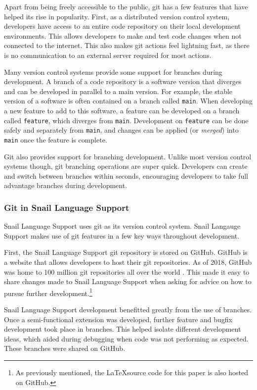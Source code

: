 \documentclass{article}
\begin{document}
Apart from being freely accessible to the public, git has a few features that have helped its rise in popularity. First, as a distributed version control system, developers have access to an entire code repository on their local development environments. This allows developers to make and test code changes when not connected to the internet. This also makes git actions feel lightning fast, as there is no communication to an external server required for most actions. 

Many version control systems provide some support for branches during development. A branch of a code repository is a software version that diverges and can be developed in parallel to a main version. For example, the stable version of a software is often contained on a branch called \lstinline{main}. When developing a new feature to add to this software, a feature can be developed on a branch called \lstinline{feature}, which diverges from \lstinline{main}. Development on \lstinline{feature} can be done safely and separately from \lstinline{main}, and changes can be applied (or \emph{merged}) into \lstinline{main} once the feature is complete.

Git also provides support for branching development. Unlike most version control systems though, git branching operations are super quick. Developers can create and switch between branches within seconds, encouraging developers to take full advantage branches during development. 

\subsubsection{Git in Snail Language Support}

Snail Language Support uses git as its version control system. Snail Langauge Support makes use of git features in a few key ways throughout development.

First, the Snail Language Support git repository is stored on GitHub. GitHub is a website that allows developers to host their git repositories. As of 2018, GitHub was home to 100 million git repositories all over the world \cite{Warner_2018}. This made it easy to share changes made to Snail Language Support when asking for advice on how to pursue further development.\footnote{As previously mentioned, the \LaTeX source code for this paper is also hosted on GitHub.}

Snail Language Support development benefitted greatly from the use of branches. Once a semi-functional extension was developed, further feature and bugfix development took place in branches. This helped isolate different development ideas, which aided during debugging when code was not performing as expected. These branches were shared on GitHub.
\end{document}
